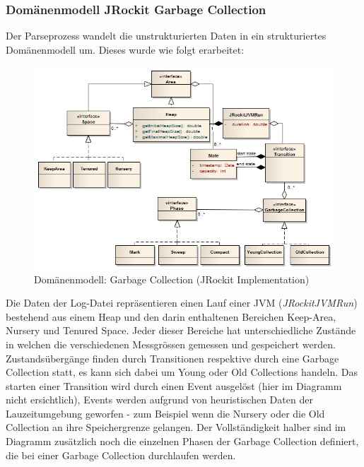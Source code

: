 \subsubsection{Domänenmodell JRockit Garbage Collection}\label{jrockit_domain_model}
Der Parseprozess wandelt die unstrukturierten Daten in ein strukturiertes Domänenmodell um. Dieses wurde wie folgt erarbeitet:
\begin{landscape}
 \begin{figure}[H]
  	\centering
        	\includegraphics[width=16.5cm]{images/jrockit_extension_domain}
	\caption{Domänenmodell: Garbage Collection (JRockit Implementation)}
\end{figure}
\end{landscape}
Die Daten der Log-Datei repräsentieren einen Lauf einer JVM (\textit{JRockitJVMRun}) bestehend aus einem Heap und den darin enthaltenen Bereichen Keep-Area, Nursery und Tenured Space. Jeder dieser Bereiche hat unterschiedliche Zustände in welchen die verschiedenen Messgrössen gemessen und gespeichert werden. Zustandsübergänge finden durch Transitionen respektive durch eine Garbage Collection statt, es kann sich dabei um Young oder Old Collections handeln. Das starten einer Transition wird durch einen Event ausgelöst (hier im Diagramm nicht ersichtlich), Events werden aufgrund von heuristischen Daten der Lauzeitumgebung geworfen - zum Beispiel wenn die Nursery oder die Old Collection an ihre Speichergrenze gelangen. Der Vollständigkeit halber sind im Diagramm zusätzlich noch die einzelnen Phasen der Garbage Collection definiert, die bei einer Garbage Collection durchlaufen werden.

